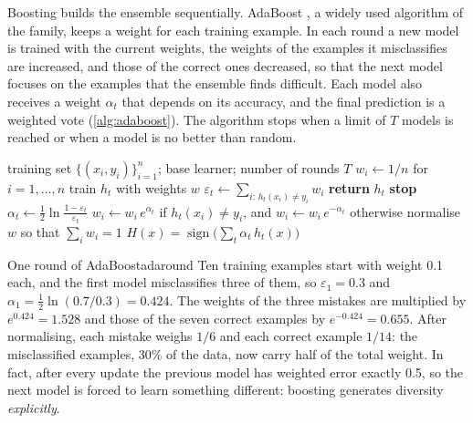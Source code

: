 Boosting builds the ensemble sequentially. AdaBoost \citep{freund1996experiments,freund1997decision},
a widely used algorithm of the family, keeps a weight for each training example. In each
round a new model is trained with the current weights, the weights of the examples it
misclassifies are increased, and those of the correct ones decreased, so that the next model
focuses on the examples that the ensemble finds difficult. Each model also receives a weight
$\alpha_t$ that depends on its accuracy, and the final prediction is a weighted vote
(\cref{alg:adaboost}). The algorithm stops when a limit of $T$ models is reached or when a
model is no better than random.

\begin{algorithm}[htbp]
\caption{AdaBoost (binary classes $y\in\{-1,+1\}$)}\label{alg:adaboost}
\begin{algorithmic}[1]
\Require training set $\{(x_i,y_i)\}_{i=1}^{n}$; base learner; number of rounds $T$
\State $w_i\gets1/n$ for $i=1,\dots,n$
  \State train $h_t$ with weights $w$
  \State $\varepsilon_t\gets\sum_{i:\,h_t(x_i)\neq y_i}w_i$ 
   \textbf{return} $h_t$  \EndIf
   \textbf{stop}  \EndIf
  \State $\alpha_t\gets\frac12\ln\frac{1-\varepsilon_t}{\varepsilon_t}$ 
  \State $w_i\gets w_i\,e^{\alpha_t}$ if $h_t(x_i)\neq y_i$, and $w_i\gets w_i\,e^{-\alpha_t}$ otherwise
  \State normalise $w$ so that $\sum_i w_i=1$
\EndFor
\State \Return $H(x)=\operatorname{sign}\bigl(\sum_{t}\alpha_t\,h_t(x)\bigr)$
\end{algorithmic}
\end{algorithm}

\begin{example}{One round of AdaBoost}{adaround}
Ten training examples start with weight 0.1 each, and the first model misclassifies three of
them, so $\varepsilon_1=0.3$ and $\alpha_1=\frac12\ln(0.7/0.3)=0.424$. The weights of the three
mistakes are multiplied by $e^{0.424}=1.528$ and those of the seven correct examples by
$e^{-0.424}=0.655$. After normalising, each mistake weighs $1/6$ and each correct example
$1/14$: the misclassified examples, 30\% of the data, now carry half of the total weight. In
fact, after every update the previous model has weighted error exactly 0.5, so the next model
is forced to learn something different: boosting generates diversity \emph{explicitly}.
\end{example}

